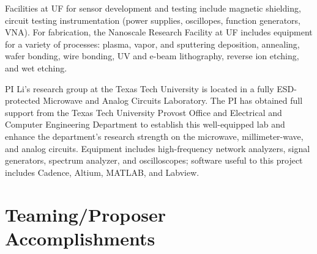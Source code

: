Facilities at UF for sensor development and testing include magnetic shielding, circuit testing instrumentation (power supplies, oscillopes, function generators, VNA). For fabrication, the Nanoscale Research Facility at UF includes equipment for a variety of processes: plasma, vapor, and sputtering deposition, annealing, wafer bonding, wire bonding, UV and e-beam lithography, reverse ion etching, and wet etching.

PI Li’s research group at the Texas Tech University is located in a fully ESD-protected Microwave and Analog Circuits Laboratory. The PI has obtained full support from the Texas Tech University Provost Office and Electrical and Computer Engineering Department to establish this well-equipped lab and enhance the department’s research strength on the microwave, millimeter-wave, and analog circuits. Equipment includes high-frequency network analyzers, signal generators, spectrum analyzer, and oscilloscopes; software useful to this project includes Cadence, Altium, MATLAB, and Labview.

\section{Teaming/Proposer Accomplishments}


